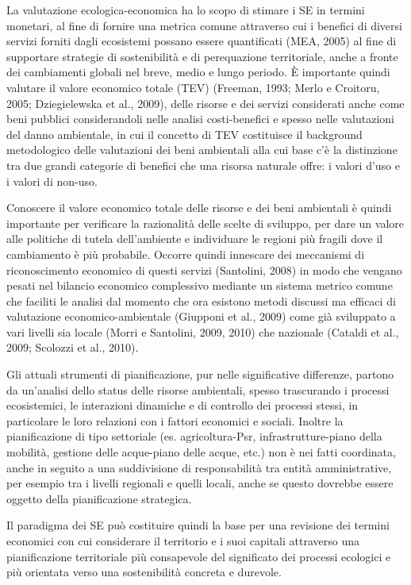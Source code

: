 \documentclass[11pt,a4paper]{article}
\begin{document}
	La valutazione
	ecologica-economica ha lo scopo di
	stimare i SE in termini monetari, al
	fine di fornire una metrica comune
	attraverso cui i benefici di diversi servizi
	forniti dagli ecosistemi possano essere
	quantificati (MEA, 2005) al fine di
	supportare strategie di sostenibilità e di
	perequazione territoriale, anche a fronte
	dei cambiamenti globali nel breve, medio
	e lungo periodo. È importante quindi
	valutare il valore economico totale (TEV)
	(Freeman, 1993; Merlo e Croitoru, 2005;
	Dziegielewska et al., 2009), delle risorse
	e dei servizi considerati anche come
	beni pubblici considerandoli nelle analisi
	costi-benefici e spesso nelle valutazioni
	del danno ambientale, in cui il concetto
	di TEV costituisce il background
	metodologico delle valutazioni dei beni
	ambientali alla cui base c'è la distinzione
	tra due grandi categorie di benefici che
	una risorsa naturale offre: i valori d'uso
	e i valori di non-uso. 
	
	Conoscere il valore
	economico totale delle risorse e dei beni
	ambientali è quindi importante per
	verificare la razionalità delle scelte di
	sviluppo, per dare un valore alle politiche
	di tutela dell'ambiente e individuare le
	regioni più fragili dove il cambiamento è
	più probabile. Occorre quindi innescare
	dei meccanismi di riconoscimento
	economico di questi servizi (Santolini,
	2008) in modo che vengano pesati nel
	bilancio economico complessivo mediante
	un sistema metrico comune che faciliti
	le analisi dal momento che ora esistono
	metodi discussi ma efficaci di valutazione
	economico-ambientale (Giupponi et al.,
	2009) come già sviluppato a vari livelli sia
	locale (Morri e Santolini, 2009, 2010) che
	nazionale (Cataldi et al., 2009; Scolozzi et
	al., 2010).
	
	Gli attuali strumenti di pianificazione,
	pur nelle significative differenze,
	partono da un'analisi dello status delle
	risorse ambientali, spesso trascurando
	i processi ecosistemici, le interazioni
	dinamiche e di controllo dei processi
	stessi, in particolare le loro relazioni
	con i fattori economici e sociali. Inoltre
	la pianificazione di tipo settoriale (es.
	agricoltura-Psr, infrastrutture-piano della
	mobilità, gestione delle acque-piano delle
	acque, etc.) non è nei fatti coordinata,
	anche in seguito a una suddivisione di
	responsabilità tra entità amministrative,
	per esempio tra i livelli regionali e quelli
	locali, anche se questo dovrebbe essere
	oggetto della pianificazione strategica.
	
	Il paradigma dei SE può costituire
	quindi la base per una revisione dei
	termini economici con cui considerare il
	territorio e i suoi capitali attraverso una
	pianificazione territoriale più consapevole
	del significato dei processi ecologici e più
	orientata verso una sostenibilità concreta
	e durevole.
	
\end{document}
